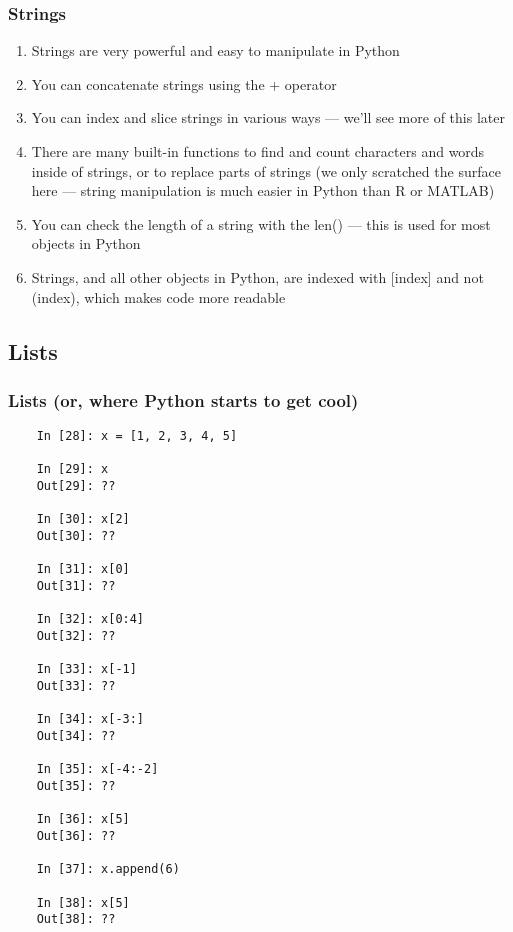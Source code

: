 \documentclass{beamer}
\begin{document}
\begin{frame}
\frametitle{Strings}
	\begin{enumerate}
		\item Strings are very powerful and easy to manipulate in Python

		\item You can concatenate strings using the + operator

		\item You can index and slice strings in various ways --- we'll see more of this later

		\item There are many built-in functions to find and count characters and words inside of strings, or to replace parts of strings (we only scratched the surface here --- string manipulation is much easier in Python than R or MATLAB)

		\item You can check the length of a string with the len() --- this is used for most objects in Python
		\item Strings, and all other objects in Python, are indexed with [index] and not (index), which makes code more readable
	\end{enumerate}
\end{frame}

\subsection{Lists}

\begin{frame}[fragile]
\frametitle{Lists (or, where Python starts to get cool)}
\begin{lstlisting}
	In [28]: x = [1, 2, 3, 4, 5]

	In [29]: x
	Out[29]: ??

	In [30]: x[2]
	Out[30]: ??

	In [31]: x[0]
	Out[31]: ??

	In [32]: x[0:4]
	Out[32]: ??

	In [33]: x[-1]
	Out[33]: ??

	In [34]: x[-3:]
	Out[34]: ??

	In [35]: x[-4:-2]
	Out[35]: ??

	In [36]: x[5]
	Out[36]: ??

	In [37]: x.append(6)
	
	In [38]: x[5]
	Out[38]: ??
\end{lstlisting}
\end{frame}
\end{document}
